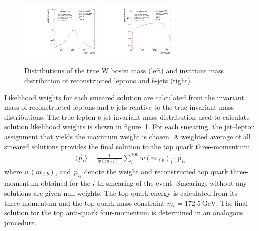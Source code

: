 \begin{figure}[htb]
    \begin{center}
        \includegraphics[width=0.35\textwidth]{fig_fullRun2UL/SmearingPlots/ULcomp_KinReco_W_mass_step0.pdf}
        \includegraphics[width=0.35\textwidth]{fig_fullRun2UL/SmearingPlots/ULcomp_KinReco_mbl_true_step0.pdf}
        \caption{\small Distributions of the true W boson mass (left) and invariant mass distribution of reconstructed leptons and $b$-jets (right).}
       \label{fig:inputDists}
    \end{center}
\end{figure}

Likelihood weights for each smeared solution are calculated from the invariant mass of reconstructed leptons and $b$-jets relative to the true invariant mass distributions.
The true lepton-$b$-jet invariant mass distribution used to calculate solution likelihood weights is shown in figure~\ref{fig:inputDists}.
For each smearing, the jet--lepton assignment that yields the maximum weight is chosen.
A weighted average of all smeared solutions provides the final solution to the top quark three-momentum:
\begin{align}
\langle \vec{p}_{t} \rangle = \frac{1}{w(m_{\ell b})_{\Sigma}} \sum_i^{100} w(m_{\ell b})_i \cdot \vec{p}_{t_i}
\end{align}
where $w(m_{\ell b})_i$ and $\vec{p}_{{t}_i}$ denote the weight and reconstructed top quark three-momentum obtained for the $i$-th smearing of the event.
Smearings without any solutions are given null weights.
The top quark energy is calculated from its three-momentum and the top quark mass constraint $m_{t} = \SI{172.5}{\GeV}$.
The final solution for the top anti-quark four-momentum is determined in an analogous procedure.

